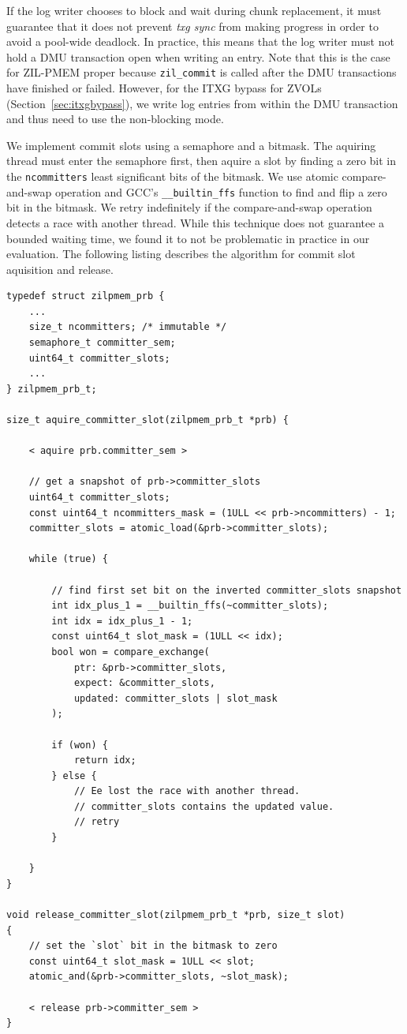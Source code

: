 \documentclass[12pt,a4paper,twoside]{book}
\begin{document}
If the log writer chooses to block and wait during chunk replacement, it must guarantee that it does not prevent \textit{txg sync} from making progress in order to avoid a pool-wide deadlock.
In practice, this means that the log writer must not hold a DMU transaction open when writing an entry.
Note that this is the case for ZIL-PMEM proper because \lstinline{zil_commit} is called after the DMU transactions have finished or failed.
However, for the ITXG bypass for ZVOLs (Section~\ref{sec:itxgbypass}), we write log entries from within the DMU transaction and thus need to use the non-blocking mode.

We implement commit slots using a semaphore and a bitmask.
The aquiring thread must enter the semaphore first, then aquire a slot by finding a zero bit in the \lstinline{ncommitters} least significant bits of the bitmask.
We use atomic compare-and-swap operation and GCC's \lstinline{__builtin_ffs} function to find and flip a zero bit in the bitmask.
We retry indefinitely if the compare-and-swap operation detects a race with another thread.
While this technique does not guarantee a bounded waiting time, we found it to not be problematic in practice in our evaluation.
The following listing describes the algorithm for commit slot aquisition and release.

\begin{lstlisting}
typedef struct zilpmem_prb {
    ...
    size_t ncommitters; /* immutable */
	semaphore_t committer_sem;
	uint64_t committer_slots;
    ...
} zilpmem_prb_t;

size_t aquire_committer_slot(zilpmem_prb_t *prb) {

    < aquire prb.committer_sem >

    // get a snapshot of prb->committer_slots
	uint64_t committer_slots;
	const uint64_t ncommitters_mask = (1ULL << prb->ncommitters) - 1;
	committer_slots = atomic_load(&prb->committer_slots);

	while (true) {

        // find first set bit on the inverted committer_slots snapshot
		int idx_plus_1 = __builtin_ffs(~committer_slots);
		int idx = idx_plus_1 - 1;
		const uint64_t slot_mask = (1ULL << idx);
		bool won = compare_exchange(
            ptr: &prb->committer_slots,
            expect: &committer_slots,
            updated: committer_slots | slot_mask
        );

		if (won) {
			return idx;
		} else {
            // Ee lost the race with another thread.
            // committer_slots contains the updated value.
            // retry
        }

	}
}

void release_committer_slot(zilpmem_prb_t *prb, size_t slot)
{
    // set the `slot` bit in the bitmask to zero
	const uint64_t slot_mask = 1ULL << slot;
	atomic_and(&prb->committer_slots, ~slot_mask);

    < release prb->committer_sem >
}
\end{lstlisting}
\end{document}
